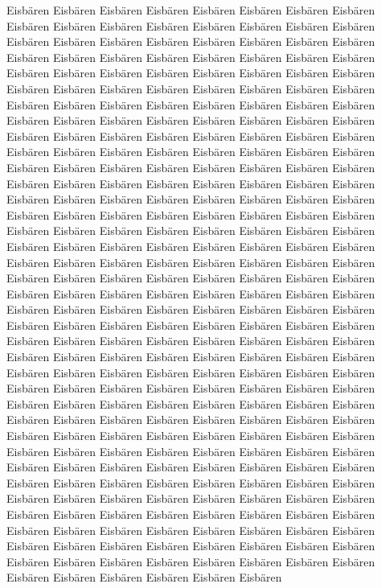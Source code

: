 \documentclass[a4paper, twoside, 12pt]{report}
\begin{document}
Eisb\"aren Eisb\"aren Eisb\"aren Eisb\"aren Eisb\"aren Eisb\"aren Eisb\"aren Eisb\"aren Eisb\"aren Eisb\"aren Eisb\"aren Eisb\"aren Eisb\"aren Eisb\"aren Eisb\"aren Eisb\"aren Eisb\"aren Eisb\"aren Eisb\"aren Eisb\"aren Eisb\"aren Eisb\"aren Eisb\"aren Eisb\"aren Eisb\"aren Eisb\"aren Eisb\"aren Eisb\"aren Eisb\"aren Eisb\"aren Eisb\"aren Eisb\"aren Eisb\"aren Eisb\"aren Eisb\"aren Eisb\"aren Eisb\"aren Eisb\"aren Eisb\"aren Eisb\"aren Eisb\"aren Eisb\"aren Eisb\"aren Eisb\"aren Eisb\"aren Eisb\"aren Eisb\"aren Eisb\"aren Eisb\"aren Eisb\"aren Eisb\"aren Eisb\"aren Eisb\"aren Eisb\"aren Eisb\"aren Eisb\"aren Eisb\"aren Eisb\"aren Eisb\"aren Eisb\"aren Eisb\"aren Eisb\"aren Eisb\"aren Eisb\"aren Eisb\"aren Eisb\"aren Eisb\"aren Eisb\"aren Eisb\"aren Eisb\"aren Eisb\"aren Eisb\"aren Eisb\"aren Eisb\"aren Eisb\"aren Eisb\"aren Eisb\"aren Eisb\"aren Eisb\"aren Eisb\"aren Eisb\"aren Eisb\"aren Eisb\"aren Eisb\"aren Eisb\"aren Eisb\"aren Eisb\"aren  Eisb\"aren Eisb\"aren Eisb\"aren Eisb\"aren Eisb\"aren Eisb\"aren Eisb\"aren Eisb\"aren Eisb\"aren Eisb\"aren Eisb\"aren Eisb\"aren Eisb\"aren Eisb\"aren Eisb\"aren Eisb\"aren Eisb\"aren Eisb\"aren Eisb\"aren Eisb\"aren Eisb\"aren Eisb\"aren Eisb\"aren Eisb\"aren Eisb\"aren Eisb\"aren Eisb\"aren Eisb\"aren Eisb\"aren Eisb\"aren Eisb\"aren Eisb\"aren Eisb\"aren Eisb\"aren Eisb\"aren Eisb\"aren Eisb\"aren Eisb\"aren Eisb\"aren Eisb\"aren Eisb\"aren Eisb\"aren Eisb\"aren Eisb\"aren Eisb\"aren Eisb\"aren Eisb\"aren Eisb\"aren Eisb\"aren Eisb\"aren Eisb\"aren Eisb\"aren Eisb\"aren Eisb\"aren Eisb\"aren Eisb\"aren Eisb\"aren Eisb\"aren Eisb\"aren Eisb\"aren Eisb\"aren Eisb\"aren Eisb\"aren Eisb\"aren Eisb\"aren Eisb\"aren Eisb\"aren Eisb\"aren Eisb\"aren Eisb\"aren Eisb\"aren Eisb\"aren Eisb\"aren Eisb\"aren Eisb\"aren Eisb\"aren Eisb\"aren Eisb\"aren Eisb\"aren Eisb\"aren Eisb\"aren Eisb\"aren Eisb\"aren Eisb\"aren Eisb\"aren Eisb\"aren Eisb\"aren Eisb\"aren Eisb\"aren Eisb\"aren Eisb\"aren Eisb\"aren Eisb\"aren Eisb\"aren Eisb\"aren Eisb\"aren Eisb\"aren Eisb\"aren Eisb\"aren Eisb\"aren  Eisb\"aren Eisb\"aren Eisb\"aren Eisb\"aren Eisb\"aren Eisb\"aren Eisb\"aren Eisb\"aren Eisb\"aren Eisb\"aren Eisb\"aren Eisb\"aren Eisb\"aren Eisb\"aren Eisb\"aren Eisb\"aren Eisb\"aren Eisb\"aren Eisb\"aren Eisb\"aren Eisb\"aren Eisb\"aren Eisb\"aren Eisb\"aren Eisb\"aren Eisb\"aren Eisb\"aren Eisb\"aren Eisb\"aren Eisb\"aren Eisb\"aren Eisb\"aren Eisb\"aren Eisb\"aren Eisb\"aren Eisb\"aren Eisb\"aren Eisb\"aren Eisb\"aren Eisb\"aren Eisb\"aren Eisb\"aren Eisb\"aren Eisb\"aren Eisb\"aren Eisb\"aren Eisb\"aren Eisb\"aren Eisb\"aren Eisb\"aren Eisb\"aren Eisb\"aren Eisb\"aren Eisb\"aren Eisb\"aren Eisb\"aren Eisb\"aren Eisb\"aren Eisb\"aren Eisb\"aren Eisb\"aren Eisb\"aren Eisb\"aren Eisb\"aren Eisb\"aren Eisb\"aren Eisb\"aren Eisb\"aren Eisb\"aren Eisb\"aren Eisb\"aren Eisb\"aren Eisb\"aren Eisb\"aren Eisb\"aren Eisb\"aren Eisb\"aren Eisb\"aren Eisb\"aren Eisb\"aren Eisb\"aren Eisb\"aren Eisb\"aren Eisb\"aren Eisb\"aren Eisb\"aren Eisb\"aren Eisb\"aren Eisb\"aren Eisb\"aren Eisb\"aren Eisb\"aren Eisb\"aren Eisb\"aren Eisb\"aren Eisb\"aren Eisb\"aren Eisb\"aren Eisb\"aren Eisb\"aren  Eisb\"aren Eisb\"aren Eisb\"aren Eisb\"aren Eisb\"aren Eisb\"aren Eisb\"aren 
\end{document}
